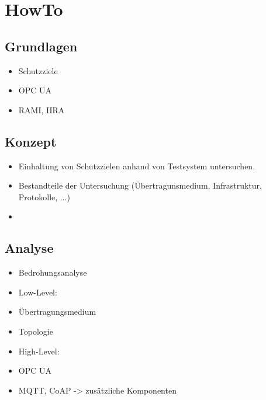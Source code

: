 \chapter{HowTo}

\section{Grundlagen}
\begin{itemize}
    \item Schutzziele
    \item OPC UA
    \item RAMI, IIRA
\end{itemize}

\section{Konzept}
\begin{itemize}
    \item Einhaltung von Schutzzielen anhand von Testsystem untersuchen.
    \item Bestandteile der Untersuchung (Übertragunsmedium, Infrastruktur, Protokolle, ...)
    \item 
\end{itemize}

\section{Analyse}
\begin{itemize}
    \item Bedrohungsanalyse
    
    \item Low-Level: 
    \item Übertragungsmedium
    \item Topologie

    \item High-Level:
    \item OPC UA
    \item MQTT, CoAP -> zusätzliche Komponenten

    
\end{itemize}